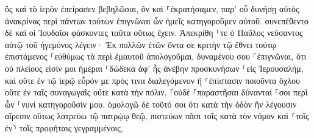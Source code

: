 \documentclass{openreader}
\begin{document}
ὃς καὶ τὸ ἱερὸν ἐπείρασεν βεβηλῶσαι, ὃν καὶ ⸀ἐκρατήσαμεν, 
παρ’ οὗ δυνήσῃ αὐτὸς ἀνακρίνας περὶ πάντων τούτων ἐπιγνῶναι ὧν ἡμεῖς κατηγοροῦμεν αὐτοῦ. 
συνεπέθεντο δὲ καὶ οἱ Ἰουδαῖοι φάσκοντες ταῦτα οὕτως ἔχειν. 
Ἀπεκρίθη ⸀τε ὁ Παῦλος νεύσαντος αὐτῷ τοῦ ἡγεμόνος λέγειν· Ἐκ πολλῶν ἐτῶν ὄντα σε κριτὴν τῷ ἔθνει τούτῳ ἐπιστάμενος ⸀εὐθύμως τὰ περὶ ἐμαυτοῦ ἀπολογοῦμαι, 
δυναμένου σου ⸀ἐπιγνῶναι, ὅτι οὐ πλείους εἰσίν μοι ἡμέραι ⸀δώδεκα ἀφ’ ἧς ἀνέβην προσκυνήσων ⸀εἰς Ἰερουσαλήμ, 
καὶ οὔτε ἐν τῷ ἱερῷ εὗρόν με πρός τινα διαλεγόμενον ἢ ⸀ἐπίστασιν ποιοῦντα ὄχλου οὔτε ἐν ταῖς συναγωγαῖς οὔτε κατὰ τὴν πόλιν, 
⸀οὐδὲ ⸀παραστῆσαι δύνανταί ⸀σοι περὶ ὧν ⸀νυνὶ κατηγοροῦσίν μου. 
ὁμολογῶ δὲ τοῦτό σοι ὅτι κατὰ τὴν ὁδὸν ἣν λέγουσιν αἵρεσιν οὕτως λατρεύω τῷ πατρῴῳ θεῷ, πιστεύων πᾶσι τοῖς κατὰ τὸν νόμον καὶ ⸂τοῖς ἐν⸃ τοῖς προφήταις γεγραμμένοις, 
\end{document}
